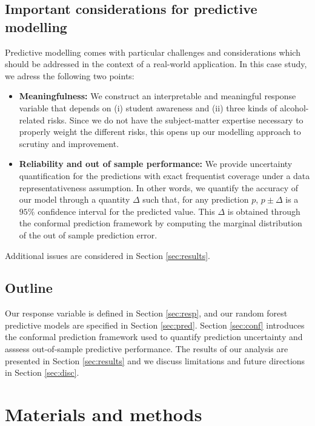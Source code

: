 \documentclass[10pt]{amsart}%
\begin{document}
\subsection{Important considerations for predictive modelling}

Predictive modelling comes with particular challenges and considerations which should be addressed in the context of a real-world application. In this case study, we adress the following two points:

\begin{itemize}
\item \textbf{Meaningfulness:} We construct an interpretable and meaningful response variable that depends on (i) student awareness and (ii) three kinds of alcohol-related risks. Since we do not have the subject-matter expertise necessary to properly weight the different risks, this opens up our modelling approach to scrutiny and improvement.
\item \textbf{Reliability and out of sample performance:} We provide uncertainty quantification for the predictions with exact frequentist coverage under a data representativeness assumption. In other words, we quantify the accuracy of our model through a quantity $\Delta$ such that, for any prediction $p$, $p \pm \Delta$ is a $95\%$ confidence interval for the predicted value. This $\Delta$ is obtained through the conformal prediction framework \cite{Vovk.2005} by computing the marginal distribution of the out of sample prediction error. 
\end{itemize}

Additional issues are considered in Section \ref{sec:results}.

\subsection{Outline}

Our response variable is defined in Section \ref{sec:resp}, and our random forest predictive models are specified in Section \ref{sec:pred}. Section \ref{sec:conf} introduces the conformal prediction framework used to quantify prediction uncertainty and asssess out-of-sample predictive performance. The results of our analysis are presented in Section \ref{sec:results} and we discuss limitations and future directions in Section \ref{sec:disc}.



\section{Materials and methods}
\end{document}
